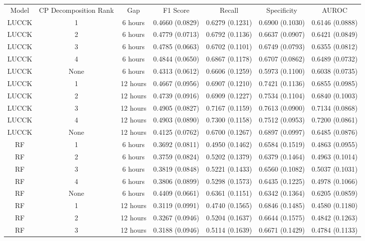 \begin{tabular}{c|c|c|c|c|c|c}
    Model & CP Decomposition Rank & Gap & F1 Score & Recall & Specificity & AUROC \\
    LUCCK & 1 & 6 hours & 0.4660 (0.0829) & 0.6279 (0.1231) & 0.6900 (0.1030) & 0.6146 (0.0888)\\
LUCCK & 2 & 6 hours & 0.4779 (0.0713) & 0.6792 (0.1136) & 0.6637 (0.0907) & 0.6421 (0.0849)\\
LUCCK & 3 & 6 hours & 0.4785 (0.0663) & 0.6702 (0.1101) & 0.6749 (0.0793) & 0.6355 (0.0812)\\
LUCCK & 4 & 6 hours & 0.4844 (0.0650) & 0.6867 (0.1178) & 0.6707 (0.0862) & 0.6489 (0.0732)\\
LUCCK & None & 6 hours & 0.4313 (0.0612) & 0.6606 (0.1259) & 0.5973 (0.1100) & 0.6038 (0.0735)\\
LUCCK & 1 & 12 hours & 0.4667 (0.0956) & 0.6907 (0.1210) & 0.7421 (0.1136) & 0.6855 (0.0985)\\
LUCCK & 2 & 12 hours & 0.4739 (0.0916) & 0.6909 (0.1227) & 0.7534 (0.1104) & 0.6840 (0.1003)\\
LUCCK & 3 & 12 hours & 0.4905 (0.0827) & 0.7167 (0.1159) & 0.7613 (0.0900) & 0.7134 (0.0868)\\
LUCCK & 4 & 12 hours & 0.4903 (0.0890) & 0.7300 (0.1158) & 0.7512 (0.0953) & 0.7200 (0.0861)\\
LUCCK & None & 12 hours & 0.4125 (0.0762) & 0.6700 (0.1267) & 0.6897 (0.0997) & 0.6485 (0.0876)\\
RF & 1 & 6 hours & 0.3692 (0.0811) & 0.4950 (0.1462) & 0.6584 (0.1519) & 0.4863 (0.0955)\\
RF & 2 & 6 hours & 0.3759 (0.0824) & 0.5202 (0.1379) & 0.6379 (0.1464) & 0.4963 (0.1014)\\
RF & 3 & 6 hours & 0.3819 (0.0848) & 0.5221 (0.1433) & 0.6560 (0.1082) & 0.5037 (0.1031)\\
RF & 4 & 6 hours & 0.3806 (0.0899) & 0.5298 (0.1573) & 0.6435 (0.1225) & 0.4978 (0.1066)\\
RF & None & 6 hours & 0.4409 (0.0661) & 0.6361 (0.1151) & 0.6342 (0.1364) & 0.6205 (0.0859)\\
RF & 1 & 12 hours & 0.3119 (0.0991) & 0.4740 (0.1565) & 0.6846 (0.1485) & 0.4580 (0.1180)\\
RF & 2 & 12 hours & 0.3267 (0.0946) & 0.5204 (0.1637) & 0.6644 (0.1575) & 0.4842 (0.1263)\\
RF & 3 & 12 hours & 0.3188 (0.0946) & 0.5114 (0.1639) & 0.6671 (0.1429) & 0.4784 (0.1133)\\

\end{tabular}

